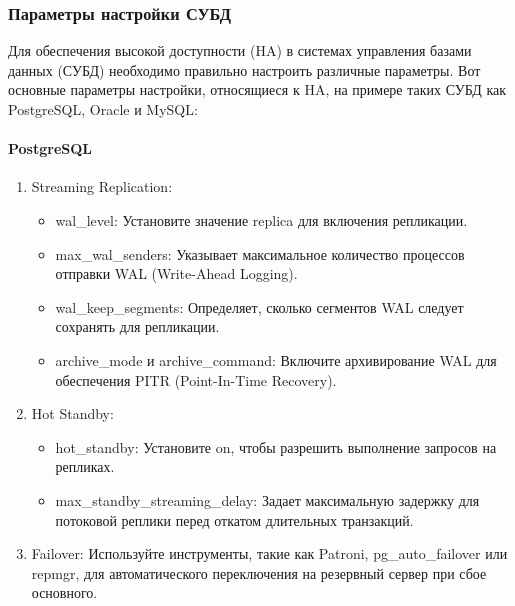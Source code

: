 \subsubsection{Параметры настройки СУБД}
Для обеспечения высокой доступности (HA) в системах управления базами данных (СУБД) необходимо правильно настроить различные параметры. Вот основные параметры настройки, относящиеся к HA, на примере таких СУБД как PostgreSQL, Oracle и MySQL:
\paragraph{PostgreSQL} \cite{availability-postgres}
\begin{enumerate}
    \item Streaming Replication:
    \begin{itemize}
        \item wal\_level: Установите значение replica для включения репликации.
        \item max\_wal\_senders: Указывает максимальное количество процессов отправки WAL (Write-Ahead Logging).
        \item wal\_keep\_segments: Определяет, сколько сегментов WAL следует сохранять для репликации.
        \item archive\_mode и archive\_command: Включите архивирование WAL для обеспечения PITR (Point-In-Time Recovery).
    \end{itemize}
    \item Hot Standby:
    \begin{itemize}
        \item hot\_standby: Установите on, чтобы разрешить выполнение запросов на репликах.
        \item max\_standby\_streaming\_delay: Задает максимальную задержку для потоковой реплики перед откатом длительных транзакций.
    \end{itemize}
    \item Failover: Используйте инструменты, такие как Patroni, pg\_auto\_failover или repmgr, для автоматического переключения на резервный сервер при сбое основного.
\end{enumerate}
